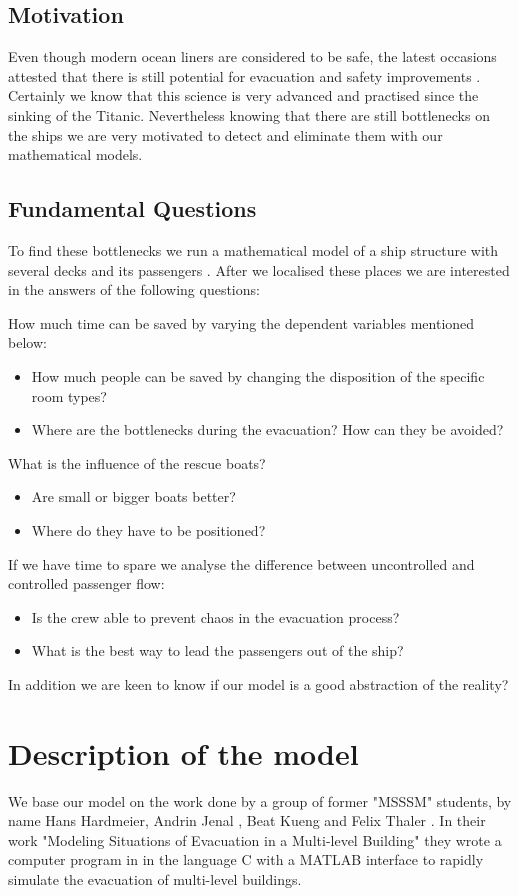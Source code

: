 \documentclass[11pt]{article}
\begin{document}
\subsection{Motivation}
Even though modern ocean liners are considered to be safe, the latest occasions attested that there is still potential for evacuation and safety improvements \cite{concordia}. Certainly we know that this science is very advanced and practised since the sinking of the Titanic. Nevertheless knowing that there are still bottlenecks on the ships we are very motivated to detect and eliminate them with our mathematical models.


\newpage
\subsection{Fundamental Questions}
To find these bottlenecks we run a mathematical model of a ship structure  with several decks and its passengers \cite{shipdecks}. After we localised these places we are interested in the answers of the following questions:

\bigskip
How much time can be saved by varying the dependent variables mentioned below:
\begin{itemize}
\item How much people can be saved by changing the disposition of the specific room types?
\item Where are the bottlenecks during the evacuation? How can they be avoided?
\end{itemize}

What is the influence of the rescue boats?
\begin{itemize}
\item Are small or bigger boats better?
\item Where do they have to be positioned?
\end{itemize}
If we have time to spare we analyse the difference between uncontrolled and controlled passenger flow:
\begin{itemize}
\item Is the crew able to prevent chaos in the evacuation process?
\item What is the best way to lead the passengers out of the ship?
\end{itemize}
In addition we are keen to know if our model is a good abstraction of the reality?



\newpage
\section{Description of the model}
We base our model on the work done by a group of former "MSSSM" students, by name Hans Hardmeier, Andrin Jenal , Beat Kueng and Felix Thaler \cite{Building}. In their work "Modeling Situations of Evacuation in a Multi-level Building" they wrote a computer program in in the language C with a MATLAB interface to rapidly simulate the evacuation of multi-level buildings.\bigskip
\end{document}
